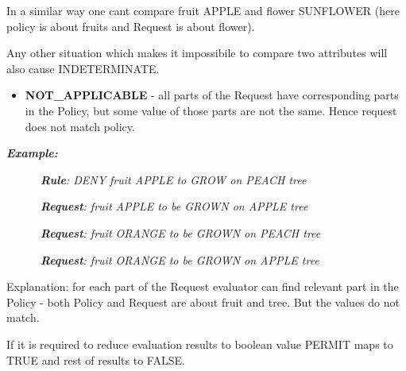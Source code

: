 \documentclass[a4paper]{article}
\newcommand\liststyleWWviiiNumxxi{%
\renewcommand\labelitemi{[F0B7?]}
\renewcommand\labelitemii{o}
\renewcommand\labelitemiii{[F0A7?]}
\renewcommand\labelitemiv{[F0B7?]}
}
\begin{document}
{\color{black}
In a similar way one can{\textquotesingle}t compare {\textquotedbl}fruit
APPLE{\textquotedbl} and {\textquotedbl}flower SUNFLOWER{\textquotedbl}
(here policy is about fruits and Request is about flower).}

{\color{black}
Any other situation which makes it impossibile to compare two attributes
will also cause {\textquotedbl}INDETERMINATE{\textquotedbl}.}


\bigskip

\liststyleWWviiiNumxxi
\begin{itemize}
\item {\color{black}
\foreignlanguage{english}{\textbf{NOT\_APPLICABLE}}\foreignlanguage{english}{
- all parts of the Request have corresponding parts in the Policy, but
some value of those parts are not the same. Hence request does not
match policy.}}
\end{itemize}
{\bfseries\itshape\color{black}
Example:}

{\upshape\color{black}
\foreignlanguage{english}{\textit{\ \ \ \ \ \ }}\foreignlanguage{english}{\textbf{\textit{Rule}}}\foreignlanguage{english}{\textit{:
DENY fruit APPLE to GROW on PEACH tree}}}

{\upshape\color{black}
\foreignlanguage{english}{\textit{\ \ \ \ \ \ }}\foreignlanguage{english}{\textbf{\textit{Request}}}\foreignlanguage{english}{\textit{:
fruit APPLE to be GROWN on APPLE tree }}}

{\upshape\color{black}
\foreignlanguage{english}{\textit{\ \ \ \ \ \ }}\foreignlanguage{english}{\textbf{\textit{Request}}}\foreignlanguage{english}{\textit{:
fruit ORANGE to be GROWN on PEACH tree }}}

{\upshape\color{black}
\foreignlanguage{english}{\textit{\ \ \ \ \ \ }}\foreignlanguage{english}{\textbf{\textit{Request}}}\foreignlanguage{english}{\textit{:
fruit ORANGE to be GROWN on APPLE tree }}}

{\color{black}
Explanation: for each part of the Request evaluator can find relevant
part in the Policy - both Policy and Request are about fruit and tree.
But the values do not match.}

{\color{black}
If it is required to reduce evaluation results to boolean value PERMIT
maps to TRUE and rest of results to FALSE.}
\end{document}
